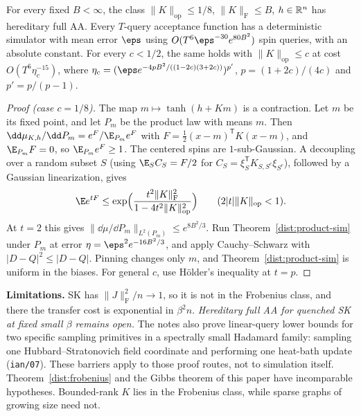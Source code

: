 \begin{theorem}\label{dist:frobenius}
For every fixed \(B<\infty\), the class \(\|K\|_{\mathrm{op}}\le1/8\),
\(\|K\|_{\mathrm F}\le B\), \(h\in\mathbb R^n\) has hereditary full AA. Every
\(T\)-query acceptance function has a deterministic simulator with mean error
\(\eps\) using \(O(T^6\eps^{-30}e^{80B^2})\) spin queries, with an absolute
constant. For every \(c<1/2\), the same holds with \(\|K\|_{\mathrm{op}}\le c\)
at cost \(O(T^6\eta_c^{-15})\), where
\(\eta_c=(\eps e^{-4pB^2/((1-2c)(3+2c))})^{p'}\), \(p=(1+2c)/(4c)\) and
\(p'=p/(p-1)\).
\end{theorem}
\begin{proof}[Proof (case \(c=1/8\))]
The map \(m\mapsto\tanh(h+Km)\) is a contraction. Let \(m\) be its fixed point,
and let \(P_m\) be the product law with means \(m\). Then
\(\dd\mu_{K,h}/\dd P_m=e^F/\E_{P_m}e^F\) with
\(F=\tfrac12(x-m)^{\mathsf T}K(x-m)\), and \(\E_{P_m}F=0\), so
\(\E_{P_m}e^F\ge1\). The centered spins are \(1\)-sub-Gaussian. A decoupling over
a random subset \(S\) (using \(\E_SC_S=F/2\) for
\(C_S=\xi_S^{\mathsf T}K_{S,S^c}\xi_{S^c}\)), followed by a Gaussian
linearization, gives
\[
 \E e^{tF}\le\exp\Bigl(\frac{t^2\|K\|_{\mathrm F}^2}{1-4t^2\|K\|_{\mathrm{op}}^2}\Bigr)
 \qquad(2|t|\|K\|_{\mathrm{op}}<1).
\]
At \(t=2\) this gives \(\|\dd\mu/\dd P_m\|_{L^2(P_m)}\le e^{8B^2/3}\). Run
Theorem~\ref{dist:product-sim} under \(P_m\) at error
\(\eta=\eps^2e^{-16B^2/3}\), and apply Cauchy--Schwarz with
\(|D-Q|^2\le|D-Q|\). Pinning changes only \(m\), and
Theorem~\ref{dist:product-sim} is uniform in the biases. For general \(c\), use
Hölder's inequality at \(t=p\).
\end{proof}
\textbf{Limitations.} SK has \(\|J\|_{\mathrm F}^2/n\to1\), so it is not in
the Frobenius class, and there the transfer cost is exponential in
\(\beta^2n\). \emph{Hereditary full AA for quenched SK at fixed small \(\beta\)
remains open.} The notes also prove linear-query lower bounds for two specific
sampling primitives in a spectrally small Hadamard family: sampling one
Hubbard--Stratonovich field coordinate and performing one heat-bath update
(\texttt{ian/07}). These barriers apply to those proof routes, not to
simulation itself. Theorem~\ref{dist:frobenius} and the Gibbs theorem of this
paper have incomparable hypotheses. Bounded-rank \(K\) lies in the Frobenius
class, while sparse graphs of growing size need not.

